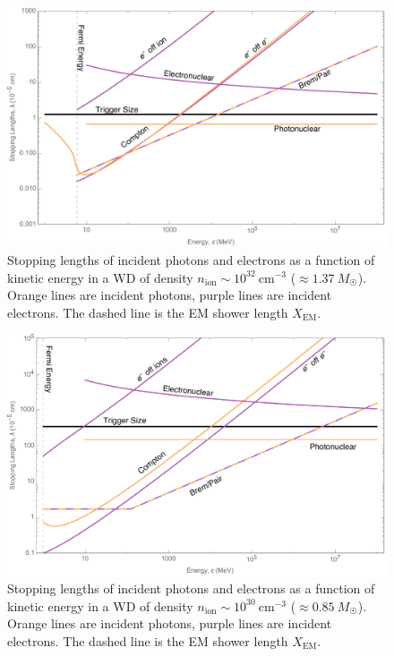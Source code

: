 \documentclass[twocolumn, preprintnumbers,amsmath,amssymb,prd, superscriptaddress]{revtex4}
\begin{document}
\begin{figure}
\includegraphics[scale=.3]{SPhighEM.pdf}
\caption{Stopping lengths of incident photons and electrons as a function of kinetic energy in a WD of density $n_\text{ion} \sim 10^{32}~\text{cm}^{-3}$ ($\approx 1.37 ~M_{\astrosun}$). 
Orange lines are incident photons, purple lines are incident electrons.
The dashed line is the EM shower length $X_\text{EM}$. 
}
\label{fig:SPhighEM}
\end{figure}

\begin{figure}
\includegraphics[scale=.3]{SPlowEM.pdf}
\caption{Stopping lengths of incident photons and electrons as a function of kinetic energy in a WD of density $n_\text{ion} \sim 10^{30}~\text{cm}^{-3}$ ($\approx 0.85 ~M_{\astrosun}$). 
Orange lines are incident photons, purple lines are incident electrons.
The dashed line is the EM shower length $X_\text{EM}$. 
}
\label{fig:SPlowEM}
\end{figure}
\end{document}
